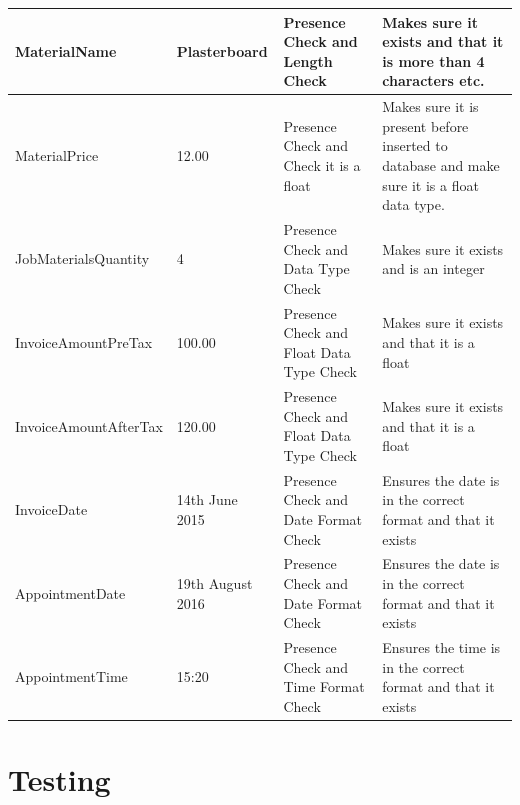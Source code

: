 \begin{longtable}{|p{3cm}|p{3cm}|p{3cm}|p{3cm}|}
MaterialName & Plasterboard & Presence Check and Length Check & Makes sure it exists and that it is more than 4 characters etc. \\ \hline
MaterialPrice & 12.00 & Presence Check and Check it is a float & Makes sure it is present before inserted to database and make sure it is a float data type. \\ \hline

JobMaterialsQuantity & 4 & Presence Check and Data Type Check & Makes sure it exists and is an integer \\ \hline \hline

InvoiceAmountPreTax & 100.00 & Presence Check and Float Data Type Check & Makes sure it exists and that it is a float \\ \hline 
InvoiceAmountAfterTax & 120.00 & Presence Check and Float Data Type Check & Makes sure it exists and that it is a float \\ \hline 
InvoiceDate & 14th June 2015 & Presence Check and Date Format Check & Ensures the date is in the correct format and that it exists \\ \hline \hline

AppointmentDate & 19th August 2016 & Presence Check and Date Format Check & Ensures the date is in the correct format and that it exists \\ \hline 
AppointmentTime & 15:20 & Presence Check and Time Format Check & Ensures the time is in the correct format and that it exists \\ \hline 


\end{longtable}

\section{Testing}

